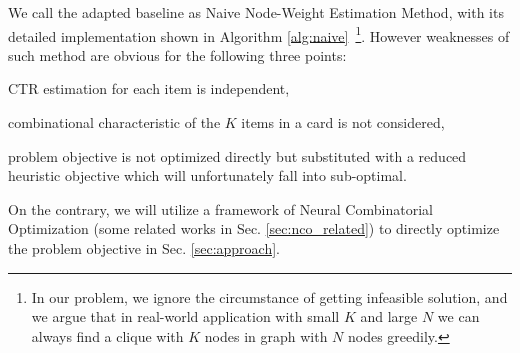 We call the adapted baseline as Naive Node-Weight Estimation Method, with its detailed implementation shown in Algorithm \ref{alg:naive}~\footnote{In our problem, we ignore the circumstance of getting infeasible solution, and we argue that in real-world application with small $K$ and large $N$ we can always find a clique with $K$ nodes in graph with $N$ nodes greedily.}.
However weaknesses of such method are obvious for the following three points:
\begin{inparaenum}
\item CTR estimation for each item is independent, 
\item combinational characteristic of the $K$ items in a card is not considered,
\item problem objective is not optimized directly but substituted with a reduced heuristic objective which will unfortunately fall into sub-optimal.
\end{inparaenum}
On the contrary, we will utilize a framework of Neural Combinatorial Optimization (some related works in Sec. \ref{sec:nco_related}) to directly optimize the problem objective in Sec. \ref{sec:approach}.

